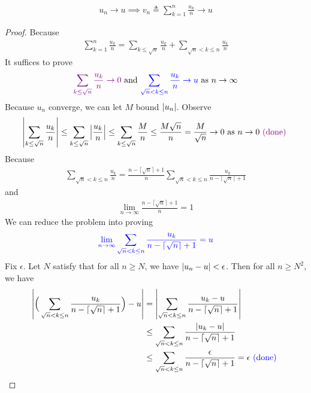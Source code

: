 \documentclass{report}
\begin{document}
\begin{theorem}
  \begin{align*}
  u_n\to u\implies v_n\triangleq \sum_{k=1}^n \frac{u_k}{n}\to u
  \end{align*}
\end{theorem}
\begin{proof}
Because 
\begin{align*}
\sum_{k=1}^n \frac{u_k}{n}=\sum_{k\leq \sqrt{n}}\frac{u_k}{n}+ \sum_{\sqrt{n}<k\leq n}\frac{u_k}{n}
\end{align*}
It suffices to prove 
\begin{align*}
\textcolor{violet}{\sum_{k\leq \sqrt{n} }\frac{u_k}{n}\to 0}\text{ and }\textcolor{blue}{\sum_{\sqrt{n}<k\leq n}\frac{u_k}{n}\to u}\text{ as }n\to \infty
\end{align*}
Because $u_n$ converge, we can let  $M$ bound  $\left|u_n\right|$. Observe 
\begin{align*}
\left|\sum_{k\leq \sqrt{n} } \frac{u_k}{n}\right|\leq \sum_{k\leq \sqrt{n}} \left|\frac{u_k}{n}\right|\leq \sum_{k\leq \sqrt{n}} \frac{M}{n}\leq \frac{M\sqrt{n} }{n}=\frac{M}{\sqrt{n}}\to 0\text{ as }n\to 0\textcolor{violet}{\text{ (done) }}
\end{align*}
Because 
\begin{align*}
\sum_{\sqrt{n}<k\leq n} \frac{u_k}{n}= \frac{n-\lceil \sqrt{n}\rceil +1 }{n}\sum_{\sqrt{n}<k\leq n} \frac{u_k}{n-\lceil \sqrt{n}  \rceil+1}
\end{align*}
and 
\begin{align*}
  \lim_{n\to \infty} \frac{n- \lceil \sqrt{n}\rceil +1 }{n}=1
\end{align*}
We can reduce the problem into proving 
\begin{align*}
  \textcolor{blue}{\lim_{n\to \infty}\sum_{\sqrt{n}<k\leq n} \frac{u_k}{n- \lceil \sqrt{n}\rceil +1 }=u}
\end{align*}
Fix $\epsilon $. Let $N$ satisfy that for all  $n\geq N$, we have $\left|u_n-u\right|<\epsilon $. Then for all $n \geq N^2$, we have 
\begin{align*}
  \left|\Big(\sum_{\sqrt{n}<k \leq n } \frac{u_k}{n-\lceil \sqrt{n}\rceil +1 } \Big)- u\right|  &=\left|\sum_{\sqrt{n}<k\leq n } \frac{u_k-u}{n-\lceil \sqrt{n}\rceil +1 } \right|\\
  &\leq \sum_{\sqrt{n}<k\leq n} \frac{\left|u_k-u\right|}{n-\lceil \sqrt{n}\rceil +1  }\\
  &\leq \sum_{\sqrt{n}<k\leq n} \frac{\epsilon }{n-\lceil \sqrt{n}\rceil +1  }=\epsilon \textcolor{blue}{\text{ (done) }}
\end{align*}
\end{proof}
\end{document}
